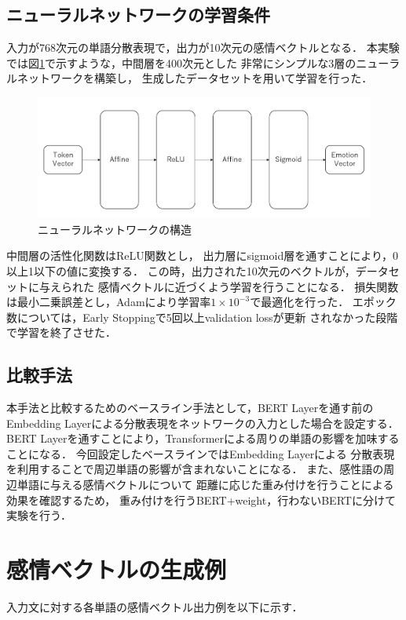 	\subsection{ニューラルネットワークの学習条件}
		入力が768次元の単語分散表現で，出力が10次元の感情ベクトルとなる．
		本実験では図\ref{fig:network}で示すような，中間層を400次元とした
		非常にシンプルな3層のニューラルネットワークを構築し，
		生成したデータセットを用いて学習を行った．
		\begin{figure}[H]
			\centering
			\includegraphics[width=\linewidth]{./figure/network.png}
			\caption{ニューラルネットワークの構造}
			\label{fig:network}
		\end{figure}
		中間層の活性化関数はReLU関数とし，
		出力層にsigmoid層を通すことにより，0以上1以下の値に変換する．
		この時，出力された10次元のベクトルが，データセットに与えられた
		感情ベクトルに近づくよう学習を行うことになる．
		損失関数は最小二乗誤差とし，Adamにより学習率$1\times10^{-3}$で最適化を行った．
		エポック数については，Early Stoppingで5回以上validation lossが更新
		されなかった段階で学習を終了させた．
		
	\subsection{比較手法}
		本手法と比較するためのベースライン手法として，BERT Layerを通す前の
		Embedding Layerによる分散表現をネットワークの入力とした場合を設定する．
		BERT Layerを通すことにより，Transformerによる周りの単語の影響を加味することになる．
		今回設定したベースラインではEmbedding Layerによる
		分散表現を利用することで周辺単語の影響が含まれないことになる．
		また、感性語の周辺単語に与える感情ベクトルについて
		距離に応じた重み付けを行うことによる効果を確認するため，
		重み付けを行うBERT+weight，行わないBERTに分けて実験を行う．

\section{感情ベクトルの生成例}
	入力文に対する各単語の感情ベクトル出力例を以下に示す．
